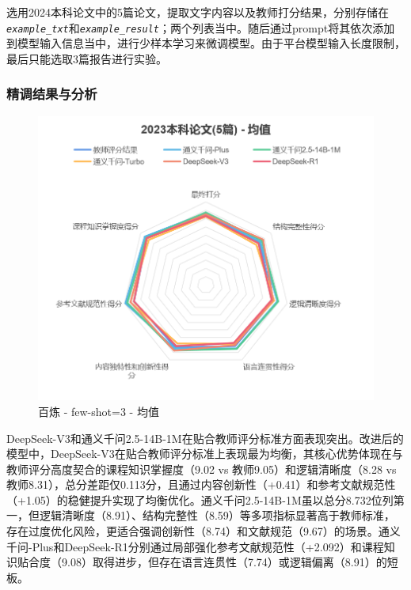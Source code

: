 \documentclass{article}
\begin{document}
选用2024本科论文中的5篇论文，提取文字内容以及教师打分结果，分别存储在\texttt{\textit{example\_txt}}和\texttt{\textit{example\_result}}；两个列表当中。随后通过prompt将其依次添加到模型输入信息当中，进行少样本学习来微调模型。由于平台模型输入长度限制，最后只能选取3篇报告进行实验。


\subsubsection{精调结果与分析}

\begin{figure}
    \centering
    \includegraphics[width=0.5\linewidth]{img/bailian-fewShot3-average.png}
    \caption{百炼 - few-shot=3 - 均值}
    \label{fig:bailian-fewShot3-average}
\end{figure}

DeepSeek-V3和通义千问2.5-14B-1M在贴合教师评分标准方面表现突出。改进后的模型中，DeepSeek-V3在贴合教师评分标准上表现最为均衡，其核心优势体现在与教师评分高度契合的课程知识掌握度（9.02 vs 教师9.05）和逻辑清晰度（8.28 vs 教师8.31），总分差距仅0.113分，且通过内容创新性（+0.41）和参考文献规范性（+1.05）的稳健提升实现了均衡优化。通义千问2.5-14B-1M虽以总分8.732位列第一，但逻辑清晰度（8.91）、结构完整性（8.59）等多项指标显著高于教师标准，存在过度优化风险，更适合强调创新性（8.74）和文献规范（9.67）的场景。通义千问-Plus和DeepSeek-R1分别通过局部强化参考文献规范性（+2.092）和课程知识贴合度（9.08）取得进步，但存在语言连贯性（7.74）或逻辑偏离（8.91）的短板。
\end{document}
